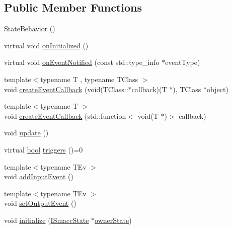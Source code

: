 \subsection*{Public Member Functions}
\begin{DoxyCompactItemize}
\item 
\hyperlink{classsmacc_1_1StateBehavior_af12ce0aee0639e34b872fea3ac23c1d4}{State\+Behavior} ()
\item 
virtual void \hyperlink{classsmacc_1_1StateBehavior_af8b18ef9895f4753d0363c9efe21b6cf}{on\+Initialized} ()
\item 
virtual void \hyperlink{classsmacc_1_1StateBehavior_ad04ebf39e7955d684642234d3e8252ea}{on\+Event\+Notified} (const std\+::type\+\_\+info $\ast$event\+Type)
\item 
{\footnotesize template$<$typename T , typename T\+Class $>$ }\\void \hyperlink{classsmacc_1_1StateBehavior_a74dcb4a32f0d6aecf8bf35872e8be6bb}{create\+Event\+Callback} (void(T\+Class\+::$\ast$callback)(T $\ast$), T\+Class $\ast$object)
\item 
{\footnotesize template$<$typename T $>$ }\\void \hyperlink{classsmacc_1_1StateBehavior_aeb745a538bfe3745d5de8225cd6760ff}{create\+Event\+Callback} (std\+::function$<$ void(T $\ast$)$>$ callback)
\item 
void \hyperlink{classsmacc_1_1StateBehavior_a5aa08609fe8095513e762ae40ca4884b}{update} ()
\item 
virtual \hyperlink{classbool}{bool} \hyperlink{classsmacc_1_1StateBehavior_a29fc4e24391c977f8686424326b3b70f}{triggers} ()=0
\item 
{\footnotesize template$<$typename T\+Ev $>$ }\\void \hyperlink{classsmacc_1_1StateBehavior_aef14060bd756c3e33c6634527f0d9a29}{add\+Input\+Event} ()
\item 
{\footnotesize template$<$typename T\+Ev $>$ }\\void \hyperlink{classsmacc_1_1StateBehavior_a66b481fdcc9e8c7bdb0cac5072d3bf8c}{set\+Output\+Event} ()
\item 
void \hyperlink{classsmacc_1_1StateBehavior_aa5022db9d47a02b79472daf337341201}{initialize} (\hyperlink{classsmacc_1_1ISmaccState}{I\+Smacc\+State} $\ast$\hyperlink{classsmacc_1_1StateBehavior_abdc8c883baf520fd01f98e046d045dca}{owner\+State})
\end{DoxyCompactItemize}

